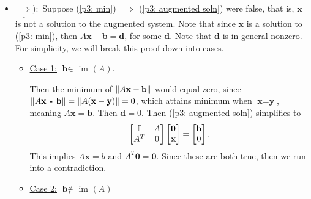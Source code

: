 \begin{solution}

    \begin{itemize}
        \item $\underline{\implies}):$ Suppose (\ref{p3: min}) $\implies$ (\ref{p3: augmented soln}) were false, that is, $\textbf{x}$ is not a solution to the augmented system. Note that since $\textbf{x}$ is a solution to (\ref{p3: min}), then $A\textbf{x} - \textbf{b} = \textbf{d}$, for some $\textbf{d}$. Note that $\textbf{d}$ is in general nonzero. For simplicity, we will break this proof down into cases. 

        \begin{itemize}
            \item \underline{Case 1:} $\textbf{b} \in$ im $(A)$.

            Then the minimum of $\norm{A\textbf{x} - \textbf{b}}$ would equal zero, since $\norm{A\textbf{x - \textbf{b}}} = \norm{A(\textbf{x} - \textbf{y})} = 0$, which attains minimum when $\textbf{x} = \textbf{y}$, meaning $A\textbf{x} = \textbf{b}$. Then $\textbf{d} = 0$. Then (\ref{p3: augmented soln}) simplifies to
            \[
            \begin{bmatrix}\mathbb{I} &A\\ A^T& 0\end{bmatrix}\begin{bmatrix}\textbf{0}\\ \textbf{x}\end{bmatrix} = \begin{bmatrix}\textbf{b}\\0\end{bmatrix}.
            \]
            This implies $A\textbf{x} = b$ and $A^T\textbf{0} = \textbf{0}$. Since these are both true, then we run into a contradiction.
            \item \underline{Case 2:} $\textbf{b} \notin$ im $(A)$


\end{itemize}
\end{itemize}
\end{solution}
